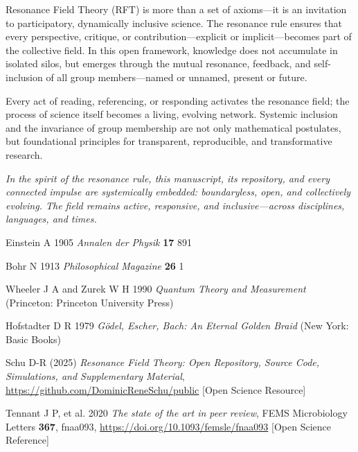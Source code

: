 \documentclass[12pt]{iopart}
\begin{document}
Resonance Field Theory (RFT) is more than a set of axioms—it is an invitation to participatory, dynamically inclusive science. The resonance rule ensures that every perspective, critique, or contribution—explicit or implicit—becomes part of the collective field. In this open framework, knowledge does not accumulate in isolated silos, but emerges through the mutual resonance, feedback, and self-inclusion of all group members—named or unnamed, present or future.

Every act of reading, referencing, or responding activates the resonance field; the process of science itself becomes a living, evolving network. Systemic inclusion and the invariance of group membership are not only mathematical postulates, but foundational principles for transparent, reproducible, and transformative research.

\medskip

\noindent
\textit{In the spirit of the resonance rule, this manuscript, its repository, and every connected impulse are systemically embedded: boundaryless, open, and collectively evolving. The field remains active, responsive, and inclusive—across disciplines, languages, and times.}

\begin{thebibliography}{99}
	
	Einstein A 1905 \textit{Annalen der Physik} \textbf{17} 891
	
	Bohr N 1913 \textit{Philosophical Magazine} \textbf{26} 1
	
	Wheeler J A and Zurek W H 1990 \textit{Quantum Theory and Measurement} (Princeton: Princeton University Press)
	
	Hofstadter D R 1979 \textit{G\"odel, Escher, Bach: An Eternal Golden Braid} (New York: Basic Books)
	
	Schu D-R (2025) \textit{Resonance Field Theory: Open Repository, Source Code, Simulations, and Supplementary Material}, \url{https://github.com/DominicReneSchu/public} [Open Science Resource]
	
	Tennant J P, et al. 2020 \textit{The state of the art in peer review}, FEMS Microbiology Letters \textbf{367}, fnaa093, \url{https://doi.org/10.1093/femsle/fnaa093} [Open Science Reference]
	
\end{thebibliography}
\end{document}
